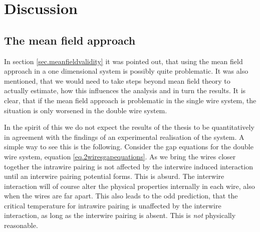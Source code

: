 
\chapter{Discussion} %

\label{Chapter11} %

\section{The mean field approach} \label{sec.Discussion.meanfieldapproach}
In section \ref{sec.meanfieldvalidity} it was pointed out, that using the mean field approach in a one dimensional system is possibly quite problematic. It was also mentioned, that we would need to take steps beyond mean field theory to actually estimate, how this influences the analysis and in turn the results. It is clear, that if the mean field approach is problematic in the single wire system, the situation is only worsened in the double wire system. 

In the spirit of this we do not expect the results of the thesis to be quantitatively in agreement with the findings of an experimental realisation of the system. A simple way to see this is the following. Consider the gap equations for the double wire system, equation \eqref{eq.2wiresgapequations}. As we bring the wires closer together the intrawire pairing is not affected by the interwire induced interaction until an interwire pairing potential forms. This is absurd. The interwire interaction will of course alter the physical properties internally in each wire, also when the wires are far apart. This also leads to the odd prediction, that the critical temperature for intrawire pairing is unaffected by the interwire interaction, as long as the interwire pairing is absent. This is \textit{not} physically reasonable. 

